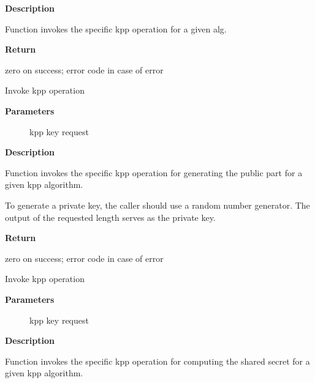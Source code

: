 \documentclass[a4paper,8pt,english]{sphinxmanual}
\begin{document}
\textbf{Description}

Function invokes the specific kpp operation for a given alg.

\textbf{Return}

zero on success; error code in case of error

\begin{fulllineitems}
\label{crypto/api-kpp:c.crypto_kpp_generate_public_key}
Invoke kpp operation

\end{fulllineitems}


\textbf{Parameters}
\begin{description}
\item[{}] \leavevmode
kpp key request

\end{description}

\textbf{Description}

Function invokes the specific kpp operation for generating the public part
for a given kpp algorithm.

To generate a private key, the caller should use a random number generator.
The output of the requested length serves as the private key.

\textbf{Return}

zero on success; error code in case of error

\begin{fulllineitems}
\label{crypto/api-kpp:c.crypto_kpp_compute_shared_secret}
Invoke kpp operation

\end{fulllineitems}


\textbf{Parameters}
\begin{description}
\item[{}] \leavevmode
kpp key request

\end{description}

\textbf{Description}

Function invokes the specific kpp operation for computing the shared secret
for a given kpp algorithm.
\end{document}
